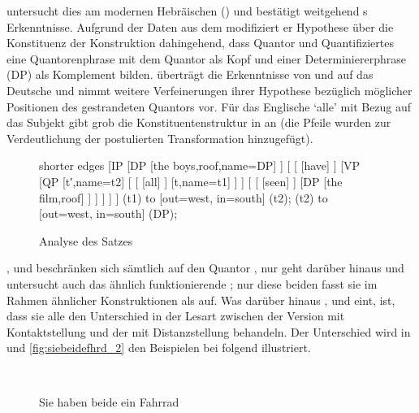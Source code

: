 \citet{shlonsky1991} untersucht dies am modernen Hebräischen () und
bestätigt weitgehend \citeauthor{sportiche1988}s Erkenntnisse. Aufgrund der
Daten aus dem  modifiziert er  Hypothese
über die Konstituenz der Konstruktion dahingehend, dass Quantor und
Quantifiziertes eine Quantorenphrase mit dem Quantor als Kopf und einer
Determiniererphrase (DP) als Komplement bilden. \citet{merchant1996} überträgt
die Erkenntnisse von \citet{sportiche1988} und \citet{shlonsky1991} auf das
Deutsche und nimmt weitere Verfeinerungen ihrer Hypothese
bezüglich möglicher Positionen des gestrandeten Quantors vor. Für das
Englische  `alle' mit Bezug auf das Subjekt gibt
\citet{merchant1996} grob die Konstituentenstruktur in  an
(die Pfeile wurden zur Verdeutlichung der postulierten Transformation
hinzugefügt).

\begin{figure}
	\begin{forest} shorter edges
	[IP
		[DP
			[{the boys},roof,name=DP]
		]
		[
			[
				[have]
			]
			[VP
				[QP
					[t′,name=t2]
					[
						[
							[all]
						]
						[t,name=t1]
					]
				]
				[
					[
						[seen]
					]
					[DP
						[{the film},roof]
					]
				]
			]
		]
	]
	 (t1) to [out=west, in=south] (t2);
	 (t2) to [out=west, in=south] (DP);
	\end{forest}
	\caption{Analyse des Satzes 
	\autocite[nach][180]{merchant1996}}
	\label{fig:qfgg}
\end{figure}

\citet{sportiche1988}, \citet{shlonsky1991} und \citet{merchant1996}
beschränken sich sämtlich auf den Quantor , nur \citet{pittner1995}
geht darüber hinaus und untersucht auch das ähnlich funktionierende ;
nur diese beiden fasst sie im Rahmen ähnlicher Konstruktionen als  auf. Was darüber hinaus \citeauthor{shlonsky1991},
\citeauthor{pittner1995} und \citeauthor{merchant1996} eint, ist, dass sie alle
den Unterschied in der Lesart zwischen der Version mit Kontaktstellung und der
mit Distanzstellung behandeln. Der Unterschied wird in
 und \ref{fig:siebeidefhrd_2} den Beispielen bei
\citet[30--31]{pittner1995} folgend illustriert.

\begin{figure}
\\
\caption{Sie haben beide ein Fahrrad}
\label{fig:siebeidefhrd_1}
\end{figure}

